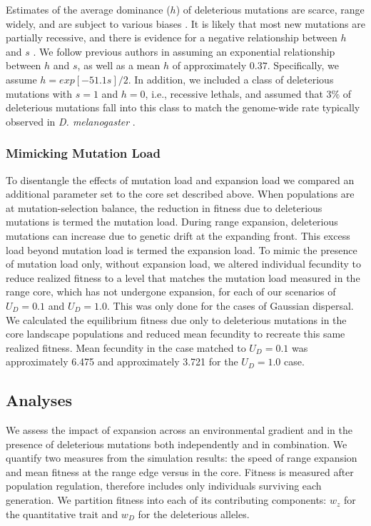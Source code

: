 Estimates of the average dominance ($h$) of deleterious mutations are scarce, range widely, and are subject to various biases \citep{Halligan:2009, Agrawal:2011}. It is likely that most new mutations are partially recessive, and there is evidence for a negative relationship between $h$ and $s$ \citep{Agrawal:2011}. We follow previous authors \citep{Lynch:1995, Deng:1996} in assuming an exponential relationship between $h$ and $s$, as well as a mean $h$ of approximately $0.37$. Specifically, we assume $h = exp[-51.1 s]/2$. In addition, we included a class of deleterious mutations with $s = 1$ and $h = 0$, i.e., recessive lethals, and assumed that $3\%$ of deleterious mutations fall into this class to match the genome-wide rate typically observed in \emph{D. melanogaster} \citep{Fry:1999}.


\subsubsection*{Mimicking Mutation Load} %
To disentangle the effects of mutation load and expansion load we compared an additional parameter set to the core set described above. When populations are at mutation-selection balance, the reduction in fitness due to deleterious mutations is termed the mutation load. During range expansion, deleterious mutations can increase due to genetic drift at the expanding front. This excess load beyond mutation load is termed the expansion load. To mimic the presence of mutation load only, without expansion load, we altered individual fecundity to reduce realized fitness to a level that matches the mutation load measured in the range core, which has not undergone expansion, for each of our scenarios of $U_D = 0.1$ and $U_D = 1.0$. This was only done for the cases of Gaussian dispersal. We calculated the equilibrium fitness due only to deleterious mutations in the core landscape populations and reduced mean fecundity to recreate this same realized fitness. Mean fecundity in the case matched to $U_D = 0.1$ was approximately 6.475 %
and approximately 3.721 %
for the $U_D = 1.0$ case.



\subsection{Analyses}
We assess the impact of expansion across an environmental gradient and in the presence of deleterious mutations both independently and in combination. We quantify two measures from the simulation results: the speed of range expansion and mean fitness at the range edge versus in the core. Fitness is measured after population regulation, therefore includes only individuals surviving each generation. We partition fitness into each of its contributing components: $w_z$ for the quantitative trait and $w_D$ for the deleterious alleles. 


